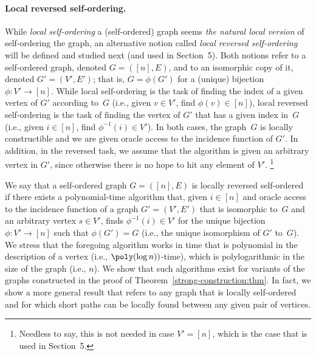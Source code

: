 \paragraph{Local reversed self-ordering.}
While {\em local self-ordering}\/ a (self-ordered) graph
seems {\em the natural local version}\/ of self-ordering the graph,
an alternative notion called {\em local reversed self-ordering}\/
will be defined and studied next
(and used in Section~5).
Both notions refer to a self-ordered graph, denoted $G=([n],E)$,
and to an isomorphic copy of it, denoted $G'=(V',E')$;
that is, $G=\phi(G')$ for a (unique) bijection  $\phi:V'\to[n]$.
While local self-ordering is the task of
finding the index of a given vertex of $G'$ according to~$G$
(i.e., given $v\in V'$, find $\phi(v)\in[n]$),
local reversed self-ordering is the task of
finding the vertex of $G'$ that has a given index in~$G$
(i.e., given $i\in[n]$, find $\phi^{-1}(i)\in V'$).
%
%
%
%
%
%
In both cases, the graph~$G$ is locally constructible
and we are given oracle access to the incidence function of $G'$.
In addition, in the reversed task, we assume that the algorithm
is given an arbitrary vertex in $G'$,
since otherwise there is no hope to hit any element of $V'$.
\footnote{Needless to say, this is not needed in case $V'=[n]$,
which is the case that is used in Section~5.}

%
\label{local-reversed-so:def}
We say that a self-ordered graph $G=([n],E)$
is {\sf locally reversed self-ordered}
if there exists a polynomial-time algorithm that,
given $i\in[n]$
and oracle access to the incidence function of
a graph $G'=(V',E')$ that is isomorphic to~$G$
and an arbitrary vertex $s\in V'$,
finds $\phi^{-1}(i)\in V'$ for the unique bijection  $\phi:V'\to[n]$
such that $\phi(G')=G$
{\rm(i.e., the unique isomorphism of $G'$ to~$G$)}.
\ED
We stress that the foregoing algorithm works in time that is polynomial
in the description of a vertex (i.e., $\poly(\log n))$-time),
which is polylogarithmic in the size of the graph (i.e., $n$).
We show that such algorithms exist for variants of the graphs
constructed in the proof of Theorem~\ref{strong-construction:thm}.
In fact, we show a more general result that refers
to any graph that is locally self-ordered and for which
short paths can be locally found between any given pair of vertices.

